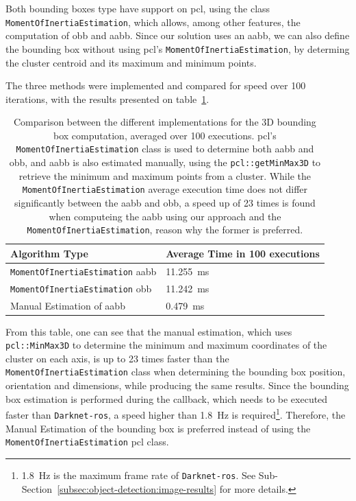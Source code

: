 Both bounding boxes type have support on \ac{pcl}, using the class \texttt{MomentOfInertiaEstimation}, which allows, among other features, the computation of \ac{obb} and \ac{aabb}. Since our solution uses an \ac{aabb}, we can also define the bounding box without using \ac{pcl}'s \texttt{MomentOfInertiaEstimation}, by determing the cluster centroid and its maximum and minimum points.

The three methods were implemented and compared for speed over 100 iterations, with the results presented on table~\ref{tab:bounding-box-estimation-times}.

\begin{table}[H]
	\centering
	\renewcommand{\arraystretch}{1.2}
	\begin{tabular}{@{}p{8cm}l@{}}
		\toprule
		Algorithm Type & Average Time in 100 executions \\
		\midrule
		\texttt{MomentOfInertiaEstimation} \ac{aabb} & \SI{11.255}{\milli\second} \\
		\texttt{MomentOfInertiaEstimation} \ac{obb} & \SI{11.242}{\milli\second} \\
		Manual Estimation of \ac{aabb}& \SI{0.479}{\milli\second} \\
		\bottomrule
	\end{tabular}
	\caption{Comparison between the different implementations for the 3D bounding box computation, averaged over 100 executions. \ac{pcl}'s \texttt{MomentOfInertiaEstimation} class is used to determine both \ac{aabb} and \ac{obb}, and \ac{aabb} is also estimated manually, using the \texttt{pcl::getMinMax3D} to retrieve the minimum and maximum points from a cluster. While the \texttt{MomentOfInertiaEstimation} average execution time does not differ significantly between the \ac{aabb} and \ac{obb}, a speed up of 23 times is found when computeing the \ac{aabb} using our approach and the \texttt{MomentOfInertiaEstimation}, reason why the former is preferred.} 
	\label{tab:bounding-box-estimation-times}
\end{table}

From this table, one can see that the manual estimation, which uses \texttt{pcl::MinMax3D} to determine the minimum and maximum coordinates of the cluster on each axis, is up to 23 times faster than the \texttt{MomentOfInertiaEstimation} class when determining the bounding box position, orientation and dimensions, while producing the same results. Since the bounding box estimation is performed during the callback, which needs to be executed faster than \texttt{Darknet-ros}, a speed higher than \SI{1.8}{\hertz} is required\footnote{\SI{1.8}{\hertz} is the maximum frame rate of \texttt{Darknet-ros}. See Sub-Section~\ref{subsec:object-detection:image-results} for more details.}. Therefore, the Manual Estimation of the bounding box is preferred instead of using the \texttt{MomentOfInertiaEstimation} \ac{pcl} class.

